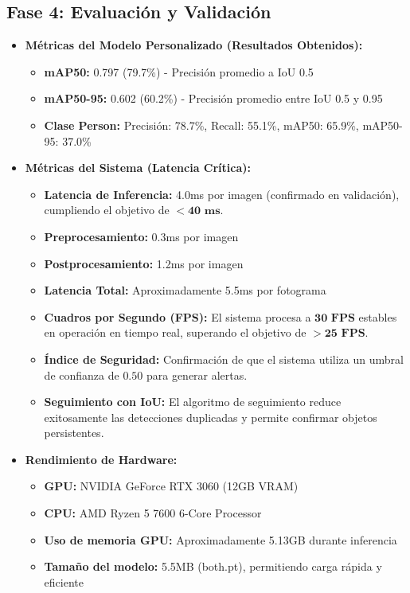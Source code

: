\documentclass[12pt, a4paper]{article}
\begin{document}
\subsection{Fase 4: Evaluación y Validación}

\begin{itemize}
\item \textbf{Métricas del Modelo Personalizado (Resultados Obtenidos):} 
\begin{itemize}
\item \textbf{mAP50:} 0.797 (79.7\%) - Precisión promedio a IoU 0.5
\item \textbf{mAP50-95:} 0.602 (60.2\%) - Precisión promedio entre IoU 0.5 y 0.95
\item \textbf{Clase Person:} Precisión: 78.7\%, Recall: 55.1\%, mAP50: 65.9\%, mAP50-95: 37.0\%
\end{itemize}
\item \textbf{Métricas del Sistema (Latencia Crítica):}
\begin{itemize}
\item \textbf{Latencia de Inferencia:} 4.0ms por imagen (confirmado en validación), cumpliendo el objetivo de $\mathbf{<40 \text{ ms}}$.
\item \textbf{Preprocesamiento:} 0.3ms por imagen
\item \textbf{Postprocesamiento:} 1.2ms por imagen
\item \textbf{Latencia Total:} Aproximadamente 5.5ms por fotograma
\item \textbf{Cuadros por Segundo (FPS):} El sistema procesa a $\mathbf{30 \text{ FPS}}$ estables en operación en tiempo real, superando el objetivo de $\mathbf{> 25 \text{ FPS}}$.
\item \textbf{Índice de Seguridad:} Confirmación de que el sistema utiliza un umbral de confianza de $\mathbf{0.50}$ para generar alertas.
\item \textbf{Seguimiento con IoU:} El algoritmo de seguimiento reduce exitosamente las detecciones duplicadas y permite confirmar objetos persistentes.
\end{itemize}
\item \textbf{Rendimiento de Hardware:}
\begin{itemize}
\item \textbf{GPU:} NVIDIA GeForce RTX 3060 (12GB VRAM)
\item \textbf{CPU:} AMD Ryzen 5 7600 6-Core Processor
\item \textbf{Uso de memoria GPU:} Aproximadamente 5.13GB durante inferencia
\item \textbf{Tamaño del modelo:} 5.5MB (both.pt), permitiendo carga rápida y eficiente
\end{itemize}
\end{itemize}
\end{document}
